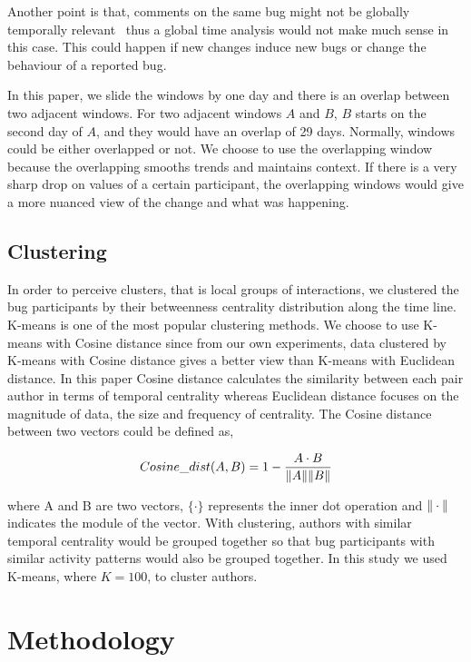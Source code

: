 \documentclass[10pt, conference, compsocconf]{IEEEtran}
\begin{document}
Another point is that, comments on the same bug might not be globally
temporally relevant~\cite{Springer:kidane,Procedia:ibaa} thus 
 a global time analysis would not make much sense in this case. This
 could happen if new changes induce new bugs or change the behaviour
 of a reported bug.

In this paper, we slide the windows by one day and there
is an overlap between two adjacent windows. For two adjacent windows
$A$ and $B$, $B$ starts on the second day of $A$, and they would have
an overlap of 29 days. Normally, windows could be either
overlapped or not. We choose to use the overlapping window because the
overlapping smooths trends and maintains context. If there
is a very sharp drop on values of a certain participant, the
overlapping windows would give a more nuanced view of the change and
what was happening.


\subsection{Clustering}

In order to perceive clusters, that is local groups of interactions,
we clustered the bug participants by their betweenness centrality
distribution along the time line. 
K-means is one of the most popular
clustering methods. 
We choose to use K-means with Cosine distance
since from our own experiments, data clustered by K-means with Cosine
distance gives a better view than K-means with Euclidean
distance. 
In this paper Cosine distance calculates the similarity between each pair
author in terms of temporal centrality whereas Euclidean distance
focuses on the magnitude of data, the size and frequency of centrality.
The
Cosine distance between two vectors could be defined as,


\begin{equation}
Cosine\_dist(A,B) = 1-\frac{A\cdot B}{\Arrowvert A \Arrowvert \Arrowvert B \Arrowvert}
\end{equation}

where A and B are two vectors, $\{\cdot\}$ represents the inner dot
operation and $\Arrowvert \cdot \Arrowvert$ indicates the module of
the vector. With clustering, authors with similar temporal centrality would be
grouped together so that bug participants with similar activity
patterns would also be grouped together.  In this study we used
K-means, where $K =
100$, to cluster authors.


\section{Methodology}
\label{methodology}
\end{document}
